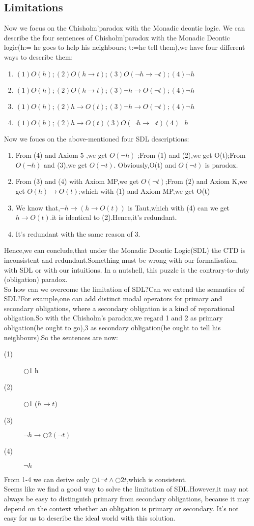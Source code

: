 \documentclass{article}
\begin{document}
\subsection{Limitations}
Now we focus on the Chisholm'paradox with the Monadic deontic logic.
We can describe the four sentences of Chisholm'paradox with the Monadic Deontic logic(h:= he goes to help his neighbours; t:=he tell them),we have four different ways to describe them:
\begin{enumerate}
\item $(1)O(h);(2)O(h\to t);(3)O(\neg h\to \neg t);(4) \neg h$
\item $(1)O(h);(2)O(h \to t);(3) \neg h \to O (\neg t); (4) \neg h$
\item $(1)O(h);(2)h\to O(t);(3)\neg h \to O(\neg t) ;(4)\neg h $
\item $ (1)O(h);(2)h\to O(t)(3)O(\neg h\to \neg t)(4)\neg h$
\end{enumerate}
Now we foucs on the above-mentioned four SDL descriptions:
\begin{enumerate}
\item From (4) and Axiom 5 ,we get $O(\neg h) $ ;From (1) and (2),we get O(t);From $O(\neg h)$ and (3),we get $ O(\neg t)$. Obviously,O(t) and $O(\neg t)$
is paradox.
\item From (3) and (4) with Axiom MP,we get $O(\neg t)$;From (2) and Axiom K,we get $O(h)\to O(t) $;which with (1) and Axiom MP,we get O(t)
\item We know that,$ \neg h \to (h \to O(t))$ is Taut,which with (4) can we get $ h \to O(t)$.it is identical to (2).Hence,it's redundant.
\item It's redundant with the same reason of 3.
\end{enumerate}
Hence,we can conclude,that under the Monadic Deontic Logic(SDL) the CTD is
inconsistent and redundant.Something must be wrong with our formalisation, with SDL or with our intuitions. In a nutshell, this puzzle is the contrary-to-duty
(obligation) paradox.\\

So how can we overcome the limitation of SDL?Can we extend the semantics of SDL?For example,one can add distinct modal operators for primary and secondary obligations, where a secondary obligation is a kind of reparational obligation.So with the Chisholm’s paradox,we regard 1 and 2 as primary obligation(he ought to go),3 as secondary obligation(he ought to tell his neighbours).So the sentences are now:
\begin{description}
\item[(1)] $\bigcirc$1 h
\item[(2)]$\bigcirc$1 ($h \to t $)
\item[(3)]$\neg h \to \bigcirc 2 (\neg t)$
\item[(4)]$\neg h$
\end{description}
From 1-4 we can derive only $\bigcirc 1 \neg t \wedge \bigcirc 2 t$,which is consistent.\\
Seems like we find a good way to solve the limitation of SDL.However,it may not always be easy to distinguish primary from secondary obligations, because it may depend on the context whether an obligation is primary or secondary. It's not easy for us to describe the ideal world with this solution. 
\end{document}
